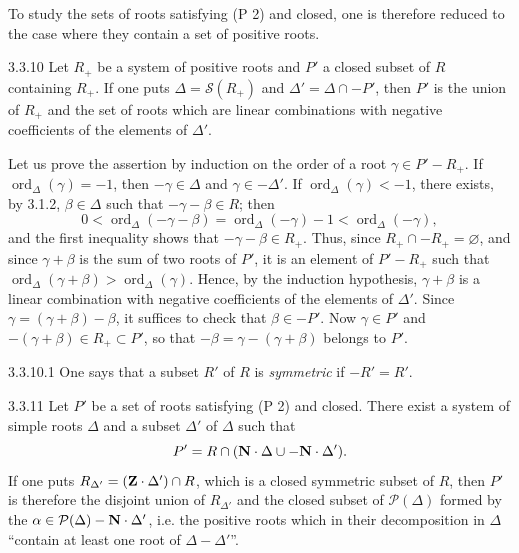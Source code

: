 To study the sets of roots satisfying (P 2) and closed, one is therefore reduced to the case where they contain a set of positive roots.
\begin{proposition}{3.3.10}\label{XXI.3.3.10}
Let $R_+$ be a system of positive roots and $P'$ a closed subset of $R$ containing $R_+$. If one puts $\Delta=\mathcal S(R_+)$ and $\Delta'=\Delta\cap-P'$, then $P'$ is the union of $R_+$ and the set of roots which are linear combinations with negative coefficients of the elements of $\Delta'$.
\end{proposition}
Let us prove the assertion by induction on the order of a root $\gamma\in P'-R_+$. If $\operatorname{ord}_\Delta(\gamma)=-1$, then $-\gamma\in\Delta$ and $\gamma\in-\Delta'$. If $\operatorname{ord}_\Delta(\gamma)<-1$, there exists, by 3.1.2, $\beta\in\Delta$ such that $-\gamma-\beta\in R$; then
\[
0<\operatorname{ord}_\Delta(-\gamma-\beta)=\operatorname{ord}_\Delta(-\gamma)-1<\operatorname{ord}_\Delta(-\gamma),
\]
and the first inequality shows that $-\gamma-\beta\in R_+$. Thus, since $R_+\cap-R_+=\varnothing$, and since $\gamma+\beta$ is the sum of two roots of $P'$, it is an element of $P'-R_+$ such that $\operatorname{ord}_\Delta(\gamma+\beta)>\operatorname{ord}_\Delta(\gamma)$. Hence, by the induction hypothesis, $\gamma+\beta$ is a linear combination with negative coefficients of the elements of $\Delta'$. Since $\gamma=(\gamma+\beta)-\beta$, it suffices to check that $\beta\in-P'$. Now $\gamma\in P'$ and $-(\gamma+\beta)\in R_+\subset P'$, so that $-\beta=\gamma-(\gamma+\beta)$ belongs to $P'$.
\begin{definition}{3.3.10.1}\label{XXI.3.3.10.1}
{\renewcommand{\thefootnote}{(9)}}%
One says that a subset $R'$ of $R$ is \emph{symmetric} if $-R'=R'$.
\end{definition}
\begin{scholium}{3.3.11}\label{XXI.3.3.11}
Let $P'$ be a set of roots satisfying (P 2) and closed. There exist a system of simple roots $\Delta$ and a subset $\Delta'$ of $\Delta$ such that
\[
P'=R\cap(\mathbf{N}\cdot\Delta\cup-\mathbf{N}\cdot\Delta').
\]
If one puts $R_{\Delta'}=(\mathbf{Z}\cdot\Delta')\cap R$, which is a closed symmetric subset of $R$, then $P'$ is therefore the disjoint union of $R_{\Delta'}$ and the closed subset of $\mathcal P(\Delta)$ formed by the $\alpha\in\mathcal P(\Delta)-\mathbf{N}\cdot\Delta'$, i.e. the positive roots which in their decomposition in $\Delta$ ``contain at least one root of $\Delta-\Delta'$''.
\end{scholium}

